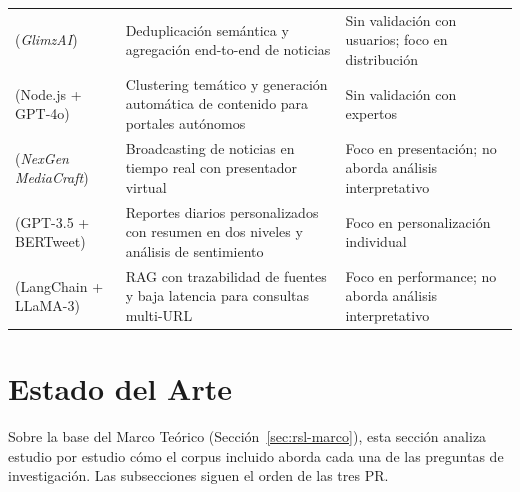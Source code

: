 \documentclass[12pt]{report}
\begin{document}
\begin{table}[H]
\begin{tabularx}{\textwidth}{@{}>{\raggedright\arraybackslash}p{3.4cm} X X@{}}
    \midrule
    \citet{behbahanian} (\textit{GlimzAI})            & Deduplicación semántica y agregación end-to-end de noticias                                                                  & Sin validación con usuarios; foco en distribución                     \\
    \addlinespace
    \citet{neupane2025} (Node.js + GPT-4o)            & Clustering temático y generación automática de contenido para portales autónomos                                             & Sin validación con expertos                                           \\
    \addlinespace
    \citet{ameer:2025} (\textit{NexGen MediaCraft})   & Broadcasting de noticias en tiempo real con presentador virtual                                                              & Foco en presentación; no aborda análisis interpretativo               \\
    \addlinespace
    \citet{begum:2024} (GPT-3.5 + BERTweet)           & Reportes diarios personalizados con resumen en dos niveles y análisis de sentimiento                                         & Foco en personalización individual                                    \\
    \addlinespace
    \citet{somasundharam:2025} (LangChain + LLaMA-3)  & RAG con trazabilidad de fuentes y baja latencia para consultas multi-URL                                                     & Foco en performance; no aborda análisis interpretativo                \\
    \bottomrule
  \end{tabularx}
\end{table}

\section{Estado del Arte}
\label{sec:rsl-estado-arte}
Sobre la base del Marco Teórico (Sección~\ref{sec:rsl-marco}), esta sección analiza estudio por estudio cómo el corpus incluido aborda cada una de las preguntas de investigación. Las subsecciones siguen el orden de las tres PR.
\end{document}
